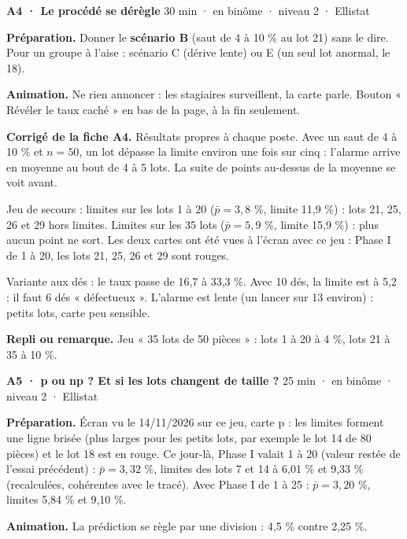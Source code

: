 \vspace{3pt}
\begin{tcolorbox}[act]\textbf{A4 · Le procédé se dérègle} \hfill {\small 30 min · en binôme · niveau 2 · Ellistat}\end{tcolorbox}
\textbf{Préparation.} Donner le \textbf{scénario B} (saut de 4 à 10 \% au lot 21) sans le dire. Pour un groupe à l'aise : scénario C (dérive lente) ou E (un seul lot anormal, le 18).\par
\textbf{Animation.} Ne rien annoncer : les stagiaires surveillent, la carte parle. Bouton « Révéler le taux caché » en bas de la page, à la fin seulement.\par
\textbf{\color{ok}Corrigé de la fiche A4.} Résultats propres à chaque poste. Avec un saut de 4 à 10 \% et $n = 50$, un lot dépasse la limite environ une fois sur cinq : l'alarme arrive en moyenne au bout de 4 à 5 lots. La suite de points au-dessus de la moyenne se voit avant.\par Jeu de secours : limites sur les lots 1 à 20 ($\bar p = 3{,}8$ \%, limite 11,9 \%) : lots 21, 25, 26 et 29 hors limites. Limites sur les 35 lots ($\bar p = 5{,}9$ \%, limite 15,9 \%) : plus aucun point ne sort. Les deux cartes ont été vues à l'écran avec ce jeu : Phase I de 1 à 20, les lots 21, 25, 26 et 29 sont rouges.\par Variante aux dés : le taux passe de 16,7 à 33,3 \%. Avec 10 dés, la limite est à 5,2 : il faut 6 dés « défectueux ». L'alarme est lente (un lancer sur 13 environ) : petits lots, carte peu sensible.\par
{\small\textbf{Repli ou remarque.} Jeu « 35 lots de 50 pièces » : lots 1 à 20 à 4 \%, lots 21 à 35 à 10 \%.}\par
\vspace{3pt}
\begin{tcolorbox}[act]\textbf{A5 · p ou np ? Et si les lots changent de taille ?} \hfill {\small 25 min · en binôme · niveau 2 · Ellistat}\end{tcolorbox}
\textbf{Préparation.} Écran vu le 14/11/2026 sur ce jeu, carte p : les limites forment une ligne brisée (plus larges pour les petits lots, par exemple le lot 14 de 80 pièces) et le lot 18 est en rouge. Ce jour-là, Phase I valait 1 à 20 (valeur restée de l'essai précédent) : $\bar p = 3{,}32$ \%, limites des lots 7 et 14 à 6,01 \% et 9,33 \% (recalculées, cohérentes avec le tracé). Avec Phase I de 1 à 25 : $\bar p = 3{,}20$ \%, limites 5,84 \% et 9,10 \%.\par
\textbf{Animation.} La prédiction se règle par une division : 4,5 \% contre 2,25 \%.\par
